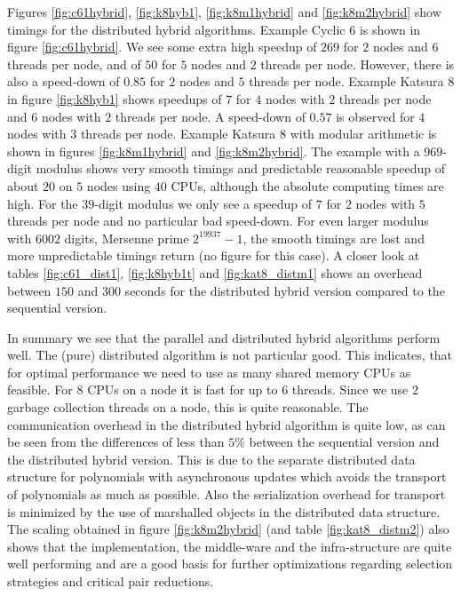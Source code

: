 \documentclass[10pt,twocolumn,a4paper]{article}
\begin{document}
Figures \ref{fig:c61hybrid}, \ref{fig:k8hyb1}, \ref{fig:k8m1hybrid}
and \ref{fig:k8m2hybrid} show timings for the distributed hybrid
algorithms.  Example Cyclic 6 is shown in figure \ref{fig:c61hybrid}.
We see some extra high speedup of $269$ for $2$ nodes and $6$ threads
per node, and of $50$ for $5$ nodes and $2$ threads per node. However,
there is also a speed-down of $0.85$ for $2$ nodes and $5$ threads per
node.  Example Katsura 8 in figure \ref{fig:k8hyb1} shows speedups of
$7$ for $4$ nodes with $2$ threads per node and $6$ nodes with $2$
threads per node.  A speed-down of $0.57$ is observed for $4$ nodes
with $3$ threads per node.  Example Katsura 8 with modular arithmetic
is shown in figures \ref{fig:k8m1hybrid} and \ref{fig:k8m2hybrid}.
The example with a $969$-digit modulus shows very smooth timings and
predictable reasonable speedup of about $2$0 on $5$ nodes using $40$
CPUs, although the absolute computing times are high.  For the
$39$-digit modulus we only see a speedup of $7$ for $2$ nodes with $5$
threads per node and no particular bad speed-down. For even larger
modulus with $6002$ digits, Mersenne prime $2^{19937}-1$, the smooth
timings are lost and more unpredictable timings return (no figure for
this case).  A closer look at tables \ref{fig:c61_dist1},
\ref{fig:k8hyb1t} and \ref{fig:kat8_distm1} shows an overhead between $150$ and $300$ seconds for the distributed
hybrid version compared to the sequential version.

In summary we see that the parallel and distributed hybrid algorithms
perform well. The (pure) distributed algorithm is not particular good.
This indicates, that for optimal performance we need to use as many
shared memory CPUs as feasible. For $8$ CPUs on a node it is fast for
up to $6$ threads. Since we use $2$ garbage collection threads on a
node, this is quite reasonable. The communication overhead in the
distributed hybrid algorithm is quite low, as can be seen from the
differences of less than $5 \%$ between the sequential version and the
distributed hybrid version. This is due to the separate distributed
data structure for polynomials with asynchronous updates which avoids
the transport of polynomials as much as possible. Also the
serialization overhead for transport is minimized by the use of
marshalled objects in the distributed data structure. The scaling
obtained in figure \ref{fig:k8m2hybrid} (and table
\ref{fig:kat8_distm2}) also shows that the implementation, the
middle-ware and the infra-structure are quite well performing and are
a good basis for further optimizations regarding selection strategies
and critical pair reductions.
\end{document}
